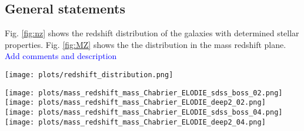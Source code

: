 \documentclass[onecolumn]{aa}
\begin{document}
\subsection{General statements}
\label{subsec:overall:results}

Fig. \ref{fig:nz} shows the redshift distribution of the galaxies with determined stellar properties.
Fig. \ref{fig:MZ} shows the the distribution in the mass redshift plane. 
\textcolor{blue}{Add comments and description}

\begin{figure*}
\begin{center}
\caption{\label{fig:nz}Redshift distribution for the galaxies considered in this analysis using a Chabrier IMF and the ELODIE library. Galaxies with stellar mass constrained within $\pm0.2$dex (solid lines) and $\pm0.4$dex (dashed lines) are depicted (top panel).}
\texttt{[image: plots/redshift\_distribution.png]}
\end{center}
\end{figure*}


\begin{figure*}
\begin{center}
\caption{\label{fig:MZ}Redshift distribution for the galaxies considered in this analysis using a Chabrier IMF and the ELODIE library. Galaxies with stellar mass constrained within $\pm0.2$dex (solid lines) and $\pm0.4$dex (dashed lines) are depicted (top panel). }
\texttt{[image: plots/mass\_redshift\_mass\_Chabrier\_ELODIE\_sdss\_boss\_02.png]}
\hspace*{-0.5cm}
\texttt{[image: plots/mass\_redshift\_mass\_Chabrier\_ELODIE\_deep2\_02.png]} \\
\hspace*{-0.5cm}
\texttt{[image: plots/mass\_redshift\_mass\_Chabrier\_ELODIE\_sdss\_boss\_04.png]}
\hspace*{-0.5cm}
\texttt{[image: plots/mass\_redshift\_mass\_Chabrier\_ELODIE\_deep2\_04.png]}
\end{center}
\end{figure*}


\end{document}
